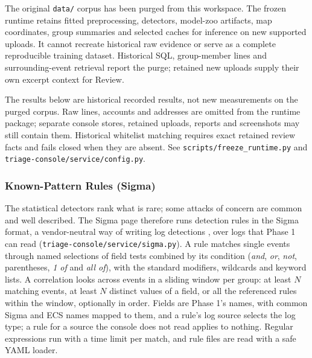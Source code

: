 \documentclass[11pt,a4paper]{article}
\begin{document}
The original \nolinkurl{data/} corpus has been purged from this workspace. The frozen runtime retains fitted preprocessing, detectors, model-zoo artifacts, map coordinates, group summaries and selected caches for inference on new supported uploads. It cannot recreate historical raw evidence or serve as a complete reproducible training dataset. Historical SQL, group-member lines and surrounding-event retrieval report the purge; retained new uploads supply their own excerpt context for Review.

The results below are historical recorded results, not new measurements on the purged corpus. Raw lines, accounts and addresses are omitted from the runtime package; separate console stores, retained uploads, reports and screenshots may still contain them. Historical whitelist matching requires exact retained review facts and fails closed when they are absent. See \nolinkurl{scripts/freeze_runtime.py} and \nolinkurl{triage-console/service/config.py}.

\subsubsection{Known-Pattern Rules (Sigma)}\label{sec:sigma-impl}

The statistical detectors rank what is rare; some attacks of concern are common and well described. The Sigma page therefore runs detection rules in the Sigma format, a vendor-neutral way of writing log detections \cite{ref28}, over logs that Phase 1 can read (\nolinkurl{triage-console/service/sigma.py}). A rule matches single events through named selections of field tests combined by its condition (\emph{and}, \emph{or}, \emph{not}, parentheses, \emph{1 of} and \emph{all of}), with the standard modifiers, wildcards and keyword lists. A correlation looks across events in a sliding window per group: at least $N$ matching events, at least $N$ distinct values of a field, or all the referenced rules within the window, optionally in order. Fields are Phase 1's names, with common Sigma and ECS names mapped to them, and a rule's log source selects the log type; a rule for a source the console does not read applies to nothing. Regular expressions run with a time limit per match, and rule files are read with a safe YAML loader.
\end{document}
